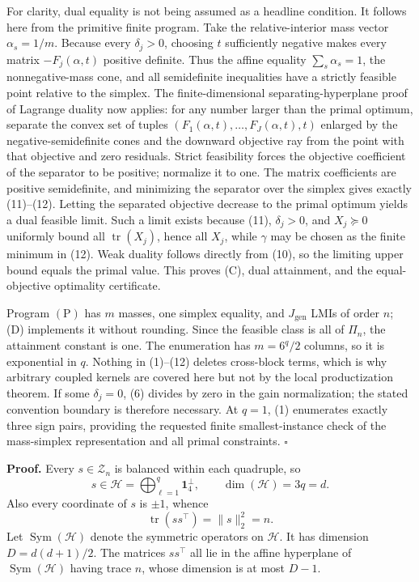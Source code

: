For clarity, dual equality is not being assumed as a headline condition.  It follows here from the primitive finite program.  Take the relative-interior mass vector \(\alpha_s=1/m\).  Because every \(\delta_j>0\), choosing \(t\) sufficiently negative makes every matrix \(-F_j(\alpha,t)\) positive definite.  Thus the affine equality \(\sum_s\alpha_s=1\), the nonnegative-mass cone, and all semidefinite inequalities have a strictly feasible point relative to the simplex.  The finite-dimensional separating-hyperplane proof of Lagrange duality now applies: for any number larger than the primal optimum, separate the convex set of tuples \((F_1(\alpha,t),\ldots,F_J(\alpha,t),t)\) enlarged by the negative-semidefinite cones and the downward objective ray from the point with that objective and zero residuals.  Strict feasibility forces the objective coefficient of the separator to be positive; normalize it to one.  The matrix coefficients are positive semidefinite, and minimizing the separator over the simplex gives exactly (11)--(12).  Letting the separated objective decrease to the primal optimum yields a dual feasible limit.  Such a limit exists because (11), \(\delta_j>0\), and \(X_j\succeq0\) uniformly bound all \(\operatorname{tr}(X_j)\), hence all \(X_j\), while \(\gamma\) may be chosen as the finite minimum in (12).  Weak duality follows directly from (10), so the limiting upper bound equals the primal value.  This proves (C), dual attainment, and the equal-objective optimality certificate.

Program \((\mathrm P)\) has \(m\) masses, one simplex equality, and \(J_{\mathrm{gen}}\) LMIs of order \(n\); (D) implements it without rounding.  Since the feasible class is all of \(\Pi_n\), the attainment constant is one.  The enumeration has \(m=6^q/2\) columns, so it is exponential in \(q\).  Nothing in (1)--(12) deletes cross-block terms, which is why arbitrary coupled kernels are covered here but not by the local productization theorem.  If some \(\delta_j=0\), (6) divides by zero in the gain normalization; the stated convention boundary is therefore necessary.  At \(q=1\), (1) enumerates exactly three sign pairs, providing the requested finite smallest-instance check of the mass-simplex representation and all primal constraints. \(\square\)

\textbf{Proof.}
Every \(s\in\mathcal Z_n\) is balanced within each quadruple, so
\[
s\in\mathcal H
=\bigoplus_{\ell=1}^q\mathbf1_4^\perp,
\qquad \dim(\mathcal H)=3q=d. \tag{1}
\]
Also every coordinate of \(s\) is \(\pm1\), whence
\[
\operatorname{tr}(ss^\top)=\|s\|_2^2=n. \tag{2}
\]
Let \(\operatorname{Sym}(\mathcal H)\) denote the symmetric operators on \(\mathcal H\).  It has dimension
\(D=d(d+1)/2\).  The matrices \(ss^\top\) all lie in the affine hyperplane of \(\operatorname{Sym}(\mathcal H)\) having trace \(n\), whose dimension is at most \(D-1\).

